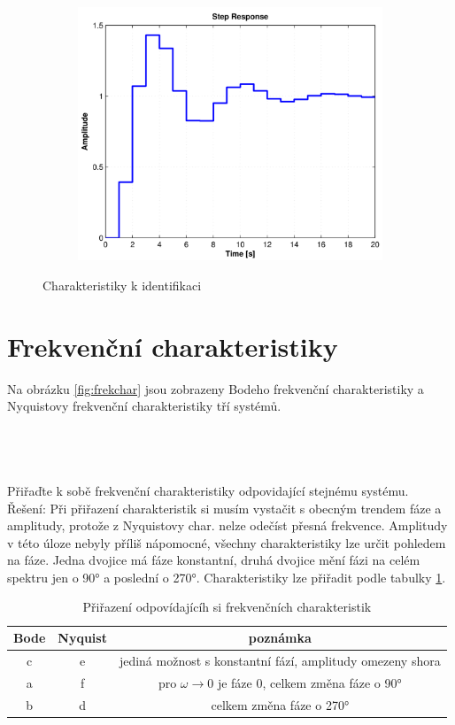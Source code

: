 \documentclass[twoside]{article}
\begin{document}
\begin{figure}[htbp]
\begin{subfigure}{0.25\textwidth}
	\includegraphics[width=\linewidth]{zadani11-f}
  \label{fig:charakteristiky:f}
  \caption{}
\end{subfigure}
\caption{Charakteristiky k identifikaci}
\label{fig:charakteristiky}
\end{figure}


\section{Frekvenční charakteristiky}
\label{sec:ukol12}
Na obrázku \ref{fig:frekchar} jsou zobrazeny Bodeho frekvenční charakteristiky a Nyquistovy frekvenční charakteristiky tří systémů.
\subsection{~}
Přiřaďte k sobě frekvenční charakteristiky odpovidající stejnému systému. \\
Řešení: Při přiřazení charakteristik si musím vystačit s obecným trendem fáze a amplitudy, protože z Nyquistovy char. nelze odečíst přesná frekvence.
Amplitudy v této úloze nebyly příliš nápomocné, všechny charakteristiky lze určit pohledem na fáze. Jedna dvojice má fáze konstantní,
druhá dvojice mění fázi na celém spektru jen o 90° a poslední o 270°.
Charakteristiky lze přiřadit podle tabulky \ref{tab:charakteristiky}.
\begin{table}[htbp]
	\label{tab:charakteristiky}
	\centering
	\begin{tabular}{c|c|c}
		Bode & Nyquist & poznámka \\
		\hline
		c & e & jediná možnost s konstantní fází, amplitudy omezeny shora \\
		a & f & pro $\omega \rightarrow 0$ je fáze 0, celkem změna fáze o 90° \\
		b & d & celkem změna fáze o 270°
	\end{tabular}
	\caption{Přiřazení odpovídajícíh si frekvenčních charakteristik}
\end{table}
\end{document}
